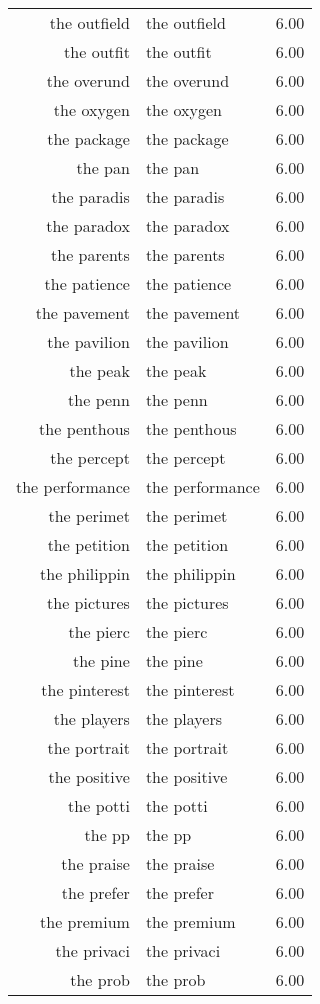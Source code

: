 \begin{table}[ht]
\begin{tabular}{rlr}
  the outfield & the outfield & 6.00 \\ 
  the outfit & the outfit & 6.00 \\ 
  the overund & the overund & 6.00 \\ 
  the oxygen & the oxygen & 6.00 \\ 
  the package & the package & 6.00 \\ 
  the pan & the pan & 6.00 \\ 
  the paradis & the paradis & 6.00 \\ 
  the paradox & the paradox & 6.00 \\ 
  the parents & the parents & 6.00 \\ 
  the patience & the patience & 6.00 \\ 
  the pavement & the pavement & 6.00 \\ 
  the pavilion & the pavilion & 6.00 \\ 
  the peak & the peak & 6.00 \\ 
  the penn & the penn & 6.00 \\ 
  the penthous & the penthous & 6.00 \\ 
  the percept & the percept & 6.00 \\ 
  the performance & the performance & 6.00 \\ 
  the perimet & the perimet & 6.00 \\ 
  the petition & the petition & 6.00 \\ 
  the philippin & the philippin & 6.00 \\ 
  the pictures & the pictures & 6.00 \\ 
  the pierc & the pierc & 6.00 \\ 
  the pine & the pine & 6.00 \\ 
  the pinterest & the pinterest & 6.00 \\ 
  the players & the players & 6.00 \\ 
  the portrait & the portrait & 6.00 \\ 
  the positive & the positive & 6.00 \\ 
  the potti & the potti & 6.00 \\ 
  the pp & the pp & 6.00 \\ 
  the praise & the praise & 6.00 \\ 
  the prefer & the prefer & 6.00 \\ 
  the premium & the premium & 6.00 \\ 
  the privaci & the privaci & 6.00 \\ 
  the prob & the prob & 6.00 \\ 

\end{tabular}
\end{table}
